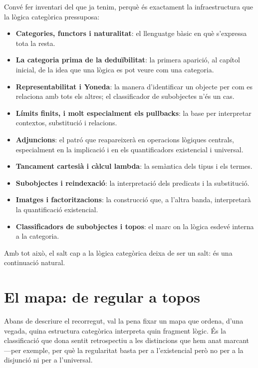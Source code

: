 Convé fer inventari del que ja tenim, perquè és exactament la infraestructura que la lògica categòrica pressuposa:
\begin{itemize}
\item \textbf{Categories, functors i naturalitat}: el llenguatge bàsic en què s'expressa tota la resta.
\item \textbf{La categoria prima de la deduïbilitat}: la primera aparició, al capítol inicial, de la idea que una lògica es pot veure com una categoria.
\item \textbf{Representabilitat i Yoneda}: la manera d'identificar un objecte per com es relaciona amb tots els altres; el classificador de subobjectes n'és un cas.
\item \textbf{Límits finits, i molt especialment els pullbacks}: la base per interpretar contextos, substitució i relacions.
\item \textbf{Adjuncions}: el patró que reapareixerà en operacions lògiques centrals, especialment en la implicació i en els quantificadors existencial i universal.
\item \textbf{Tancament cartesià i càlcul lambda}: la semàntica dels tipus i els termes.
\item \textbf{Subobjectes i reindexació}: la interpretació dels predicats i la substitució.
\item \textbf{Imatges i factoritzacions}: la construcció que, a l'altra banda, interpretarà la quantificació existencial.
\item \textbf{Classificadors de subobjectes i topos}: el marc on la lògica esdevé interna a la categoria.
\end{itemize}

Amb tot això, el salt cap a la lògica categòrica deixa de ser un salt: és una continuació natural.

\section{El mapa: de regular a topos}\label{sec:mapa}

Abans de descriure el recorregut, val la pena fixar un mapa que ordena, d'una vegada, quina estructura categòrica interpreta quin fragment lògic. És la classificació que dona sentit retrospectiu a les distincions que hem anat marcant ---per exemple, per què la regularitat basta per a l'existencial però no per a la disjunció ni per a l'universal.

